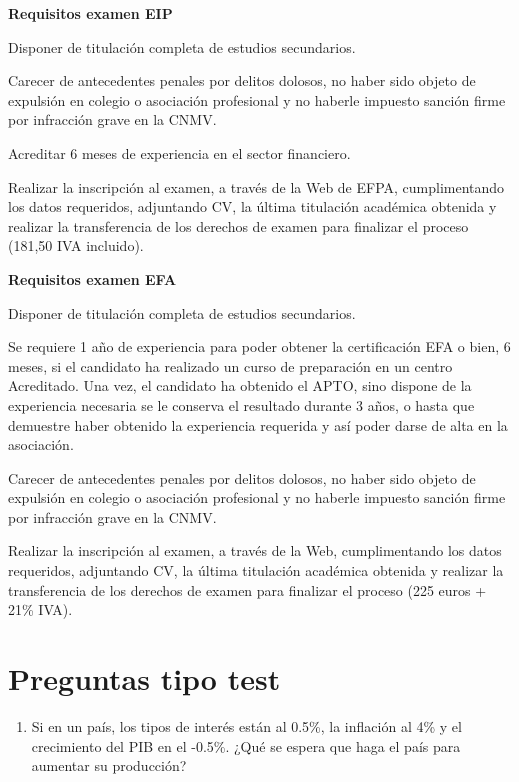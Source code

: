 \documentclass[
  letterpaper,
  DIV=11,
  numbers=noendperiod]{scrreprt}
\providecommand{\tightlist}{%
  \setlength{\itemsep}{0pt}\setlength{\parskip}{0pt}}\usepackage{longtable,booktabs,array}
\begin{document}
\textbf{Requisitos examen EIP}

Disponer de titulación completa de estudios secundarios.

Carecer de antecedentes penales por delitos dolosos, no haber sido
objeto de expulsión en colegio o asociación profesional y no haberle
impuesto sanción firme por infracción grave en la CNMV.

Acreditar 6 meses de experiencia en el sector financiero.

Realizar la inscripción al examen, a través de la Web de EFPA,
cumplimentando los datos requeridos, adjuntando CV, la última titulación
académica obtenida y realizar la transferencia de los derechos de examen
para finalizar el proceso (181,50 IVA incluido).

\textbf{Requisitos examen EFA}

Disponer de titulación completa de estudios secundarios.

Se requiere 1 año de experiencia para poder obtener la certificación EFA
o bien, 6 meses, si el candidato ha realizado un curso de preparación en
un centro Acreditado. Una vez, el candidato ha obtenido el APTO, sino
dispone de la experiencia necesaria se le conserva el resultado durante
3 años, o hasta que demuestre haber obtenido la experiencia requerida y
así poder darse de alta en la asociación.

Carecer de antecedentes penales por delitos dolosos, no haber sido
objeto de expulsión en colegio o asociación profesional y no haberle
impuesto sanción firme por infracción grave en la CNMV.

Realizar la inscripción al examen, a través de la Web, cumplimentando
los datos requeridos, adjuntando CV, la última titulación académica
obtenida y realizar la transferencia de los derechos de examen para
finalizar el proceso (225 euros + 21\% IVA).


\hypertarget{preguntas-tipo-test}{%
\chapter{Preguntas tipo test}\label{preguntas-tipo-test}}

\begin{enumerate}
\def\labelenumi{\arabic{enumi}.}
\tightlist
\item
  Si en un país, los tipos de interés están al 0.5\%, la inflación al
  4\% y el crecimiento del PIB en el -0.5\%. ¿Qué se espera que haga el
  país para aumentar su producción?
\end{enumerate}
\end{document}
